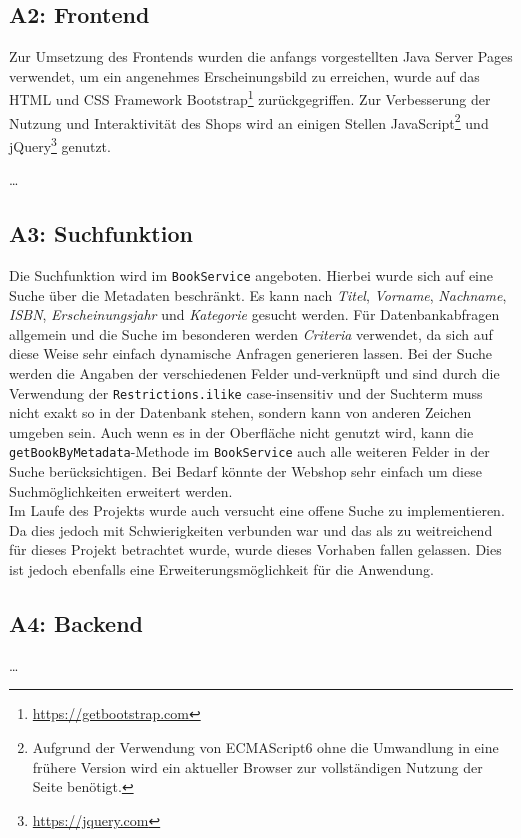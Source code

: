 	\subsection{A2: Frontend}
	Zur Umsetzung des Frontends wurden die anfangs vorgestellten Java Server Pages verwendet, um ein angenehmes Erscheinungsbild zu erreichen, wurde auf das HTML und CSS Framework Bootstrap\footnote{\hyperlink{https://getbootstrap.com}{https://getbootstrap.com}} zurückgegriffen. Zur Verbesserung der Nutzung und Interaktivität des Shops wird an einigen Stellen JavaScript\footnote{Aufgrund der Verwendung von ECMAScript6 ohne die Umwandlung in eine frühere Version wird ein aktueller Browser zur vollständigen Nutzung der Seite benötigt.} und jQuery\footnote{\hyperlink{https://jquery.com}{https://jquery.com}} genutzt.
	
	\dots

	\subsection{A3: Suchfunktion}\label{umsetzung:Suche}
	Die Suchfunktion wird im \texttt{BookService} angeboten. Hierbei wurde sich auf eine Suche über die Metadaten beschränkt. Es kann nach \textit{Titel}, \textit{Vorname}, \textit{Nachname}, \textit{ISBN}, \textit{Erscheinungsjahr} und \textit{Kategorie} gesucht werden. Für Datenbankabfragen allgemein und die Suche im besonderen werden \textit{Criteria} verwendet, da sich auf diese Weise sehr einfach dynamische Anfragen generieren lassen. Bei der Suche werden die Angaben der verschiedenen Felder und-verknüpft und sind durch die Verwendung der \texttt{Restrictions.ilike} case-insensitiv und der Suchterm muss nicht exakt so in der Datenbank stehen, sondern kann von anderen Zeichen umgeben sein.
	Auch wenn es in der Oberfläche nicht genutzt wird, kann die \texttt{getBookByMetadata}-Methode im \texttt{BookService} auch alle weiteren Felder in der Suche berücksichtigen. Bei Bedarf könnte der Webshop sehr einfach um diese Suchmöglichkeiten erweitert werden.\\
	Im Laufe des Projekts wurde auch versucht eine offene Suche zu implementieren. Da dies jedoch mit Schwierigkeiten verbunden war und das als zu weitreichend für dieses Projekt betrachtet wurde, wurde dieses Vorhaben fallen gelassen. Dies ist jedoch ebenfalls eine Erweiterungsmöglichkeit für die Anwendung.

	\subsection{A4: Backend}
	\dots
